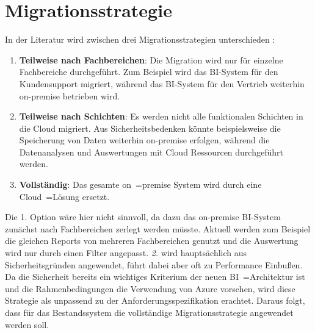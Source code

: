 \section{Migrationsstrategie} \label{sec:beschreibungMigrationsstrategie}
In der Literatur wird zwischen drei Migrationsstrategien unterschieden \cite{juan-verdejo_moving_2014}:
\begin{enumerate}
\item \textbf{Teilweise nach Fachbereichen}: Die Migration wird nur für einzelne Fachbereiche durchgeführt. Zum Beispiel wird das BI-System für den Kundensupport migriert, während das BI-System für den Vertrieb weiterhin on-premise betrieben wird.
\item \textbf{Teilweise nach Schichten}: Es werden nicht alle funktionalen Schichten in die Cloud migriert. Aus Sicherheitsbedenken könnte beispielsweise die Speicherung von Daten weiterhin on-premise erfolgen, während die Datenanalysen und Auswertungen mit Cloud Ressourcen durchgeführt werden.
\item \textbf{Vollständig}: Das gesamte on~=premise System wird durch eine Cloud~=Lösung ersetzt.
\end{enumerate}
Die 1. Option wäre hier nicht sinnvoll, da dazu das on-premise BI-System zunächst nach Fachbereichen zerlegt werden müsste. Aktuell werden zum Beispiel die gleichen Reports von mehreren Fachbereichen genutzt und die Auswertung wird nur durch einen Filter angepasst. \textit{2.} wird hauptsächlich aus Sicherheitsgründen angewendet, führt dabei aber oft zu Performance Einbußen. Da die Sicherheit bereits ein wichtiges Kriterium der neuen BI~=Architektur ist und die Rahmenbedingungen die Verwendung von Azure vorsehen, wird diese Strategie als unpassend zu der Anforderungsspezifikation erachtet. Daraus folgt, dass für das Bestandssystem die vollständige Migrationsstrategie angewendet werden soll.